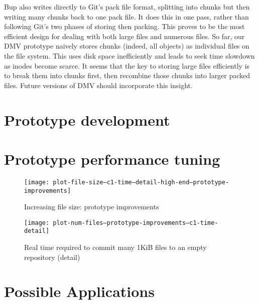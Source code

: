Bup also writes directly to Git's pack file format, splitting into chunks but
then writing many chunks back to one pack file. It does this in one pass, rather
than following Git's two phases of storing then packing. This proves to be the
most efficient design for dealing with both large files and numerous files. So
far, our DMV prototype naively stores chunks (indeed, all objects) as individual
files on the file system. This uses disk space inefficiently and leads to seek
time slowdown as inodes become scarce. It seems that the key to storing large
files efficiently is to break them into chunks first, then recombine those
chunks into larger packed files. Future versions of DMV should incorporate this
insight.



%



\section{Prototype development}


\section{Prototype performance tuning}

\begin{figure}[]
  \caption{Increasing file size: prototype improvements}
  \label{fig:plot-file-size--c1-time--prototype-improvements}
  \centering
    \texttt{[image: plot-file-size--c1-time--detail-high-end--prototype-improvements]}
\end{figure}

\begin{figure}[p]
  \caption{Real time required to commit many 1KiB files to an empty repository
  (detail)}
  \label{fig:plot-num-files--prototype-improvements--c1-time-detail}
  \centering
    \texttt{[image: plot-num-files--prototype-improvements--c1-time-detail]}
\end{figure}



\section{Possible Applications}

